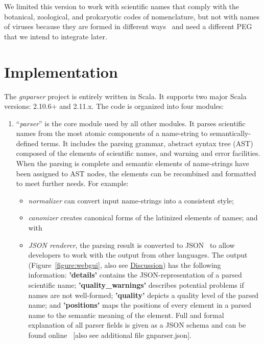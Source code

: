\documentclass{bmcart}
\begin{document}
We limited this version to work with scientific names that comply with the botanical, zoological, and prokaryotic codes of nomenclature, but not with names of viruses because they are formed in different ways~\cite{ICTV, Patterson2016} and need a different PEG that we intend to integrate later.

\section*{Implementation}

The \textit{gnparser} project is entirely written in Scala. It supports two major Scala versions: 2.10.6+ and 2.11.x. The code is organized into four modules:

\begin{enumerate}

  \item ``\textit{parser}'' is the core module used by all other modules. It parses scientific names from the most atomic components of a name-string to semantically-defined terms. It includes the parsing grammar, abstract syntax tree (AST) composed of the elements of scientific names, and warning and error facilities. When the parsing is complete and semantic elements of name-strings have been assigned to AST nodes, the elements can be recombined and formatted to meet further needs. For example:

\begin{itemize}

  \item \textit{normalizer} can convert input name-strings into a consistent style;

  \item \textit{canonizer} creates canonical forms of the latinized elements of names; and with

  \item \textit{JSON renderer}, the parsing result is converted to JSON~\cite{bray2014javascript} to allow developers to work with the output from other languages. The output (Figure~\ref{figure:webgui}, also see \hyperref[sec:discussion]{Discussion}) has the following information: \textbf{'details'} contains the JSON-representation of a parsed scientific name; \textbf{'quality\_warnings'} describes potential problems if names are not well-formed; \textbf{'quality'} depicts a quality level of the parsed name; and \textbf{'positions'} maps the positions of every element in a parsed name to the semantic meaning of the element. Full and formal explanation of all parser fields is given as a JSON schema and can be found online~\cite{gnparser-json} [also see additional file gnparser.json].


\end{itemize}
\end{enumerate}
\end{document}
